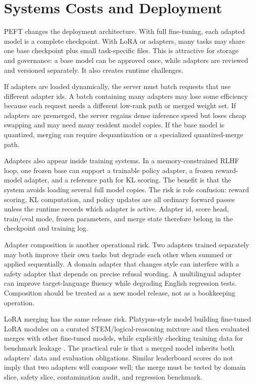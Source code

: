 \section{Systems Costs and Deployment}
\label{sec:peft-systems-deployment}

PEFT changes the deployment architecture. With full fine-tuning, each adapted model is a complete checkpoint. With LoRA or adapters, many tasks may share one base checkpoint plus small task-specific files. This is attractive for storage and governance: a base model can be approved once, while adapters are reviewed and versioned separately. It also creates runtime challenges.

If adapters are loaded dynamically, the server must batch requests that use different adapter ids. A batch containing many adapters may lose some efficiency because each request needs a different low-rank path or merged weight set. If adapters are premerged, the server regains dense inference speed but loses cheap swapping and may need many resident model copies. If the base model is quantized, merging can require dequantization or a specialized quantized-merge path.

Adapters also appear inside training systems. In a memory-constrained RLHF loop, one frozen base can support a trainable policy adapter, a frozen reward-model adapter, and a reference path for KL scoring. The benefit is that the system avoids loading several full model copies. The risk is role confusion: reward scoring, KL computation, and policy updates are all ordinary forward passes unless the runtime records which adapter is active. Adapter id, score head, train/eval mode, frozen parameters, and merge state therefore belong in the checkpoint and training log.

Adapter composition is another operational risk. Two adapters trained separately may both improve their own tasks but degrade each other when summed or applied sequentially. A domain adapter that changes style can interfere with a safety adapter that depends on precise refusal wording. A multilingual adapter can improve target-language fluency while degrading English regression tests. Composition should be treated as a new model release, not as a bookkeeping operation.

LoRA merging has the same release risk. Platypus-style model building fine-tuned LoRA modules on a curated STEM/logical-reasoning mixture and then evaluated merges with other fine-tuned models, while explicitly checking training data for benchmark leakage \cite{lee2023platypus}. The practical rule is that a merged model inherits both adapters' data and evaluation obligations. Similar leaderboard scores do not imply that two adapters will compose well; the merge must be tested by domain slice, safety slice, contamination audit, and regression benchmark.


